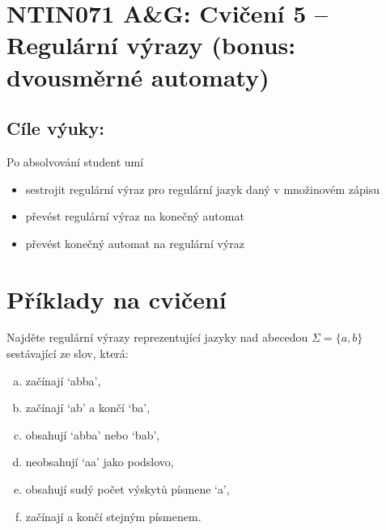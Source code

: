 \documentclass[a4paper,12pt]{amsart}
\begin{document}
\thispagestyle{empty}

\section*{NTIN071 A\&G: Cvičení 5 -- Regulární výrazy (bonus: dvousměrné automaty)}

\medskip

\subsection*{Cíle výuky:} Po absolvování student umí

\begin{itemize}\setlength{\itemsep}{0pt}
    \item sestrojit regulární výraz pro regulární jazyk daný v množinovém zápisu
    \item převést regulární výraz na konečný automat
    \item převést konečný automat na regulární výraz
\end{itemize}

\section*{Příklady na cvičení}

\medskip\begin{problem}

    Najděte regulární výrazy reprezentující jazyky nad abecedou $\Sigma = \{a, b\}$ sestávající ze slov, která:

    \begin{multicols}{2}

        \begin{enumerate}[(a)]\setlength\itemsep{0pt}
            \item začínají `abba',
            \item začínají `ab' a končí `ba',
            \item obsahují `abba' nebo `bab',
            \item neobsahují `aa' jako podslovo,
            \item obsahují sudý počet výskytů písmene `a',
            \item začínají a končí stejným písmenem.
        \end{enumerate}

    \end{multicols}

\end{problem}
\end{document}
